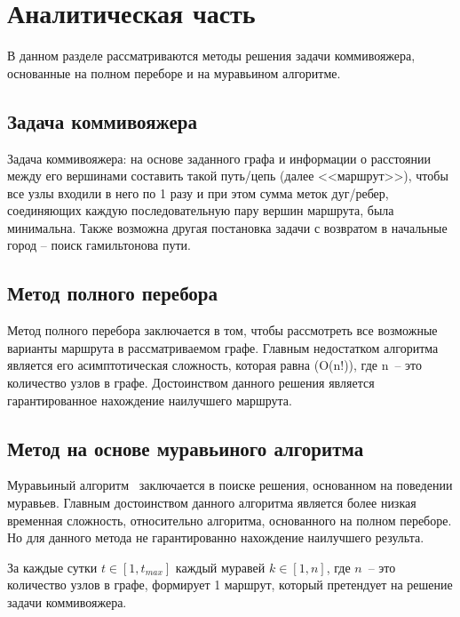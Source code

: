 \chapter{Аналитическая часть}

В данном разделе рассматриваются методы решения задачи коммивояжера, основанные на полном переборе и на муравьином алгоритме.


\section{Задача коммивояжера}

Задача коммивояжера: на основе заданного графа и информации о расстоянии между его вершинами составить такой путь/цепь (далее <<маршрут>>), чтобы все узлы входили в него по 1 разу и при этом сумма меток дуг/ребер, соединяющих каждую последовательную пару вершин маршрута, была минимальна. Также возможна другая постановка задачи с возвратом в начальные город -- поиск гамильтонова пути.

\section{Метод полного перебора}

Метод полного перебора заключается в том, чтобы рассмотреть все возможные варианты маршрута в рассматриваемом графе. Главным недостатком алгоритма является его асимптотическая сложность, которая равна (O(n!)), где n~-- это количество узлов в графе. Достоинством данного решения является гарантированное нахождение наилучшего маршрута.


\section{Метод на основе муравьиного алгоритма}

Муравьиный алгоритм~\cite{algos} заключается в поиске решения, основанном на поведении муравьев. Главным достоинством данного алгоритма является более низкая временная сложность, относительно алгоритма, основанного на полном переборе. Но для данного метода не гарантированно нахождение наилучшего результа.

За каждые сутки $t \in [1, t_{max}]$ каждый муравей $k \in [1, n]$, где $n$~-- это количество узлов в графе, формирует 1 маршрут, который претендует на решение задачи коммивояжера.

